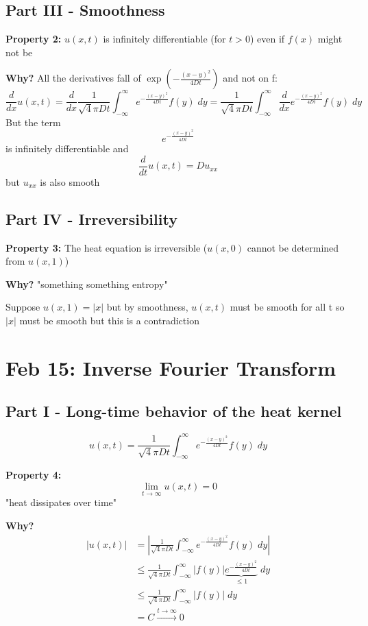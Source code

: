 \documentclass[12pt]{article}
\begin{document}
\subsection*{Part III  - Smoothness}
\textbf{Property 2:} $u(x, t)$ is infinitely differentiable (for $t >0$) even if $f(x)$ might not be 

\textbf{Why?}
All the derivatives fall of $\exp(-\frac{(x-y)^2}{4Dt})$ and not on f:
\[\frac{d}{dx} u(x, t) = \frac{d}{dx} \frac{1}{\sqrt4\pi D t} \int_{-\infty}^\infty e^{-\frac{(x - y)^2}{4Dt}} f(y) \; dy = \frac{1}{\sqrt4\pi D t} \int_{-\infty}^\infty \frac{d}{dx} e^{-\frac{(x - y)^2}{4Dt}} f(y) \; dy\]
But the term 
\[e^{-\frac{(x - y)^2}{4Dt}}\]
is infinitely differentiable and 
\[\frac{d}{dt}u(x, t) = Du_{xx}\]
but $u_{xx}$ is also smooth 

\subsection*{Part IV - Irreversibility}
\textbf{Property 3:} The heat equation is irreversible ($u(x, 0)$ cannot be determined from $u(x, 1)$)

\textbf{Why?}
"something something entropy"

Suppose $u(x, 1) = |x|$ but by smoothness, $u(x, t)$ must be smooth for all t so $|x|$ must be smooth but this is a contradiction

\section{Feb 15: Inverse Fourier Transform}
\subsection*{Part I - Long-time behavior of the heat kernel}
\[u(x, t) = \frac{1}{\sqrt4\pi D t} \int_{-\infty}^\infty e^{-\frac{(x - y)^2}{4Dt}} f(y) \; dy\]

\textbf{Property 4:} 
\[\lim_{t \to \infty} u(x, t) = 0\]
"heat dissipates over time"

\textbf{Why?}
\begin{align*}
    |u(x, t)| &= \left|\frac{1}{\sqrt4\pi D t} \int_{-\infty}^\infty e^{-\frac{(x - y)^2}{4Dt}} f(y) \; dy\right|\\
    &\leq \frac{1}{\sqrt4\pi D t} \int_{-\infty}^\infty |f(y)| \underbrace{e^{-\frac{(x - y)^2}{4Dt}}}_{\leq 1} \; dy\\
    &\leq \frac{1}{\sqrt4\pi D t} \int_{-\infty}^\infty |f(y)| \; dy\\
    &= C \overset{t \to \infty}{\longrightarrow} 0
\end{align*}
\end{document}
